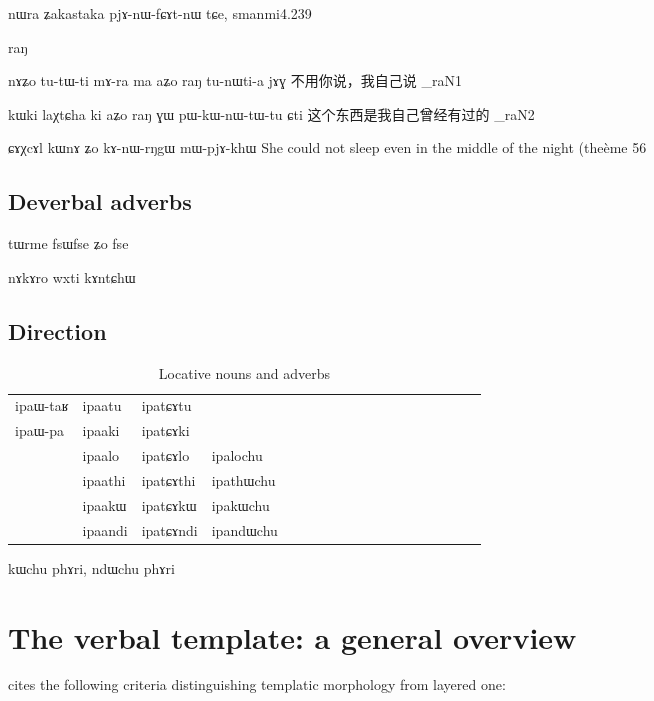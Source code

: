 \documentclass[oldfontcommands,oneside,a4paper,11pt]{memoir}
\newcommand{\ipa}[1]{{\phon #1}} %
\newcommand{\wav}[1]{}%
\begin{document}
nɯra ʑakastaka pjɤ-nɯ-fɕɤt-nɯ tɕe, 
smanmi4.239




\ipa{raŋ}

\xv nɤʑo tu-tɯ-ti mɤ-ra ma aʑo raŋ tu-nɯti-a jɤɣ
\xn 不用你说，我自己说
\ipa{8_raN1}

\xv kɯki laχtɕha ki aʑo raŋ ɣɯ pɯ-kɯ-nɯ-tɯ-tu ɕti
\xn 这个东西是我自己曾经有过的
\ipa{8_raN2}


ɕɤχcɤl kɯnɤ ʑo kɤ-nɯ-rŋgɯ mɯ-pjɤ-khɯ \wav{8_CAXcAl}
She could not sleep even in the middle of the night (theème 56
\section{Deverbal adverbs}

tɯrme fsɯfse ʑo fse

nɤkɤro wxti
kɤntɕhɯ

\section{Direction}
\begin{table}[H]
\caption{Locative nouns and adverbs}\label{tab:adv.loc}
\begin{tabular}{llllllllllllllllll} \toprule
ipa{ɯ-taʁ}  &  	ipa{atu}  &  	ipa{tɕɤtu}  &  	\\
ipa{ɯ-pa}  &  	ipa{aki}  &  	ipa{tɕɤki}  &  	\\
&	ipa{alo}  &  	ipa{tɕɤlo}  &  	ipa{lochu}  \\  
&	ipa{athi}  &  	ipa{tɕɤthi}  &  	ipa{thɯchu}  \\  
&	ipa{akɯ}  &  	ipa{tɕɤkɯ}  &  	ipa{kɯchu}  \\  
&	ipa{andi}  &  	ipa{tɕɤndi}  &  	ipa{ndɯchu}  \\  
\bottomrule
\end{tabular}
\end{table}

kɯchu phɤri, ndɯchu phɤri



\chapter{The verbal template: a general overview} \label{chapt:template}
 \cite[218]{bickel07inflectional} cites the following criteria distinguishing templatic morphology from layered one: 
\end{document}
